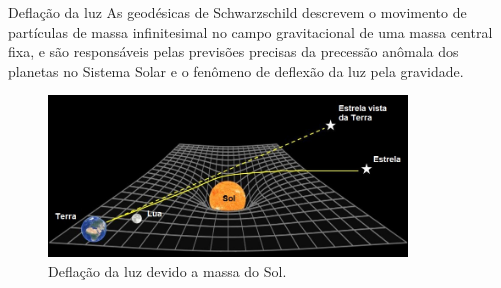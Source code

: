 \documentclass{beamer}
\theoremstyle{plain}
\theoremstyle{definition}
\theoremstyle{definition}
\theoremstyle{definition}
\theoremstyle{definition}
\theoremstyle{definition}
\theoremstyle{definition}
\theoremstyle{definition}
\theoremstyle{definition}
\begin{document}
\begin{frame}{Deflação da luz}
\justifying
    As geodésicas de Schwarzschild descrevem o movimento de partículas de massa infinitesimal no campo gravitacional de uma massa central fixa, e são responsáveis pelas previsões precisas da precessão anômala dos planetas no Sistema Solar e o fenômeno de deflexão da luz pela gravidade.

\begin{figure}[!h]
\begin{center}
\caption{Deflação da luz devido a massa do Sol.} \label{fig:02}
\includegraphics[width=0.85\textwidth]{Template_ERMACMS/defle.png}
\end{center}
\end{figure}
\end{frame}

\end{document}
